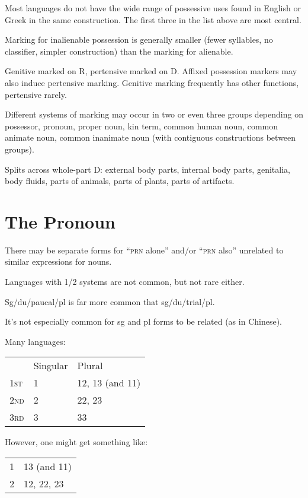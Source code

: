 \documentclass[11pt]{article}
\newcommand{\I}[1]{\textsc{#1}}   %
\begin{document}
\noindent Most languages do not have the wide range of possessive uses
found in English or Greek in the same construction.  The first three
in the list above are most central.

Marking for inalienable possession is generally smaller (fewer
syllables, no classifier, simpler construction) than the marking for
alienable.

Genitive marked on R, pertensive marked on D.  Affixed possession
markers may also induce pertensive marking.  Genitive marking
frequently has other functions, pertensive rarely.

Different systems of marking may occur in two or even three groups
depending on possessor, pronoun, proper noun, kin term, common human
noun, common animate noun, common inanimate noun (with contiguous
constructions between groups).

Splits across whole-part D: external body parts, internal body parts,
genitalia, body fluids, parts of animals, parts of plants, parts of
artifacts. 

\section{The Pronoun}

There may be separate forms for ``\I{prn} alone'' and/or ``\I{prn}
also'' unrelated to similar expressions for nouns.

Languages with 1/2 systems are not common, but not rare either.

Sg/du/paucal/pl is far more common that sg/du/trial/pl.

It's not especially common for sg and pl forms to be related (as in
Chinese).

Many languages:

\begin{center}
\begin{tabular}{lll}
  & Singular & Plural \\
\I{1st} & 1 & 12, 13 (and 11) \\
\I{2nd} & 2 & 22, 23 \\
\I{3rd} & 3 & 33
\end{tabular}
\end{center}

However, one might get something like:

\begin{center}
\begin{tabular}{ll}
1 & 13 (and 11) \\
2 & 12, 22, 23     
\end{tabular}
\end{center}
\end{document}
